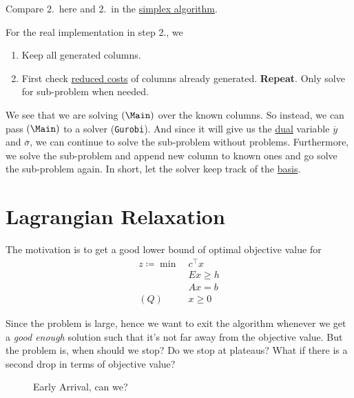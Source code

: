 \begin{note}
	Compare 2.\ here and 2.\ in the \hyperref[algo:simplex-algorithm]{simplex algorithm}.
\end{note}
\begin{remark}
	For the real implementation in step 2., we
	\begin{enumerate}
		\item Keep all generated columns.
		\item First check \hyperref[def:reduced-cost]{reduced costs} of columns already generated. \textbf{Repeat}. Only solve for sub-problem when needed.
	\end{enumerate}

	\begin{note}
		We see that we are solving \((\Main)\) over the known columns. So instead, we can pass \((\Main)\) to a solver (\texttt{Gurobi}). And since it will give us the \hyperref[def:dual]{dual} variable \(\overline{y}\) and \(\overline{\sigma}\), we can continue to solve the sub-problem without problems. Furthermore, we solve the sub-problem and append new column to known ones and go solve the sub-problem again. In short, let the solver keep track of the \hyperref[def:basis]{basis}.
	\end{note}
\end{remark}

\section{Lagrangian Relaxation}
The motivation is to get a good lower bound of optimal objective value for
\[
	\begin{aligned}
		z\coloneqq \min~ & c^{\top}x \\
		                 & Ex \geq h \\
		                 & Ax = b    \\
		(Q)\quad         & x\geq 0
	\end{aligned}
\]

Since the problem is large, hence we want to exit the algorithm whenever we get a \emph{good enough} solution such that it's not far away from the objective value. But the problem is, when should we stop? Do we stop at plateaus? What if there is a second drop in terms of objective value?

\begin{figure}[H]
	\centering
	\caption{Early Arrival, can we?}
	\label{fig:plateau}
\end{figure}

